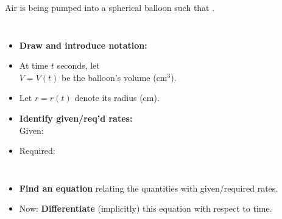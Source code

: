 
\begin{frame}
\begin{example}
Air is being pumped into a spherical balloon such that .  
\begin{columns}[c]
\begin{itemize}
\item<2-> \textbf{Draw and introduce notation:}
\item<3->  At time $ t $ seconds, let\\
  $V=V(t) $ be the balloon's volume (cm$ ^3 $).
\item<4->  Let $r=r(t)$ denote its radius (cm).
\item<5->  \textbf{Identify given/req'd rates: }\\
Given: 
\item<7->    Required:  
\end{itemize}
\abovedisplayskip=0pt
\belowdisplayskip=0pt
\abovedisplayshortskip=0pt
\belowdisplayshortskip=0pt
\end{columns}
\begin{itemize}
\item<9->  \textbf{Find an equation} relating the quantities with given/required rates.
\item<11->  Now: \textbf{Differentiate} (implicitly) this equation  with respect to time.
\end{itemize}
\end{example}
\end{frame}






